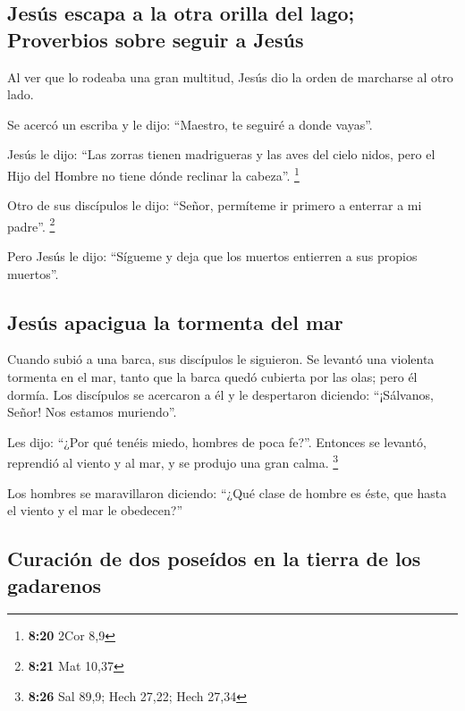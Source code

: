 \begin{paracol}{2}
{\subsection{Jesús escapa a la otra orilla del lago; Proverbios sobre
seguir a
Jesús}\label{jesuxfas-escapa-a-la-otra-orilla-del-lago-proverbios-sobre-seguir-a-jesuxfas}}

 Al ver que lo rodeaba una gran multitud, Jesús dio la
orden de marcharse al otro lado.

 Se acercó un escriba y le dijo: ``Maestro, te seguiré a
donde vayas''.

 Jesús le dijo: ``Las zorras tienen madrigueras y las
aves del cielo nidos, pero el Hijo del Hombre no tiene dónde reclinar la
cabeza''. \footnote{\textbf{8:20} 2Cor 8,9}

 Otro de sus discípulos le dijo: ``Señor, permíteme ir
primero a enterrar a mi padre''. \footnote{\textbf{8:21} Mat 10,37}

 Pero Jesús le dijo: ``Sígueme y deja que los muertos
entierren a sus propios muertos''.

\hypertarget{jesuxfas-apacigua-la-tormenta-del-mar}{%
\subsection{Jesús apacigua la tormenta del
mar}\label{jesuxfas-apacigua-la-tormenta-del-mar}}

 Cuando subió a una barca, sus discípulos le siguieron.
 Se levantó una violenta tormenta en el mar, tanto que la
barca quedó cubierta por las olas; pero él dormía.  Los
discípulos se acercaron a él y le despertaron diciendo: ``¡Sálvanos,
Señor! Nos estamos muriendo''.

 Les dijo: ``¿Por qué tenéis miedo, hombres de poca
fe?''. Entonces se levantó, reprendió al viento y al mar, y se produjo
una gran calma. \footnote{\textbf{8:26} Sal 89,9; Hech 27,22; Hech 27,34}

 Los hombres se maravillaron diciendo: ``¿Qué clase de
hombre es éste, que hasta el viento y el mar le obedecen?''

\hypertarget{curaciuxf3n-de-dos-poseuxeddos-en-la-tierra-de-los-gadarenos}{%
\subsection{Curación de dos poseídos en la tierra de los
gadarenos}\label{curaciuxf3n-de-dos-poseuxeddos-en-la-tierra-de-los-gadarenos}}


\end{paracol}
